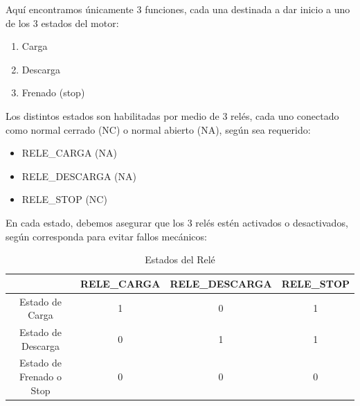                 Aquí encontramos únicamente 3 funciones, cada una destinada a dar inicio a uno de los 3 estados del motor:\par

                \begin{enumerate}
                \setlength{\itemindent}{1.5em}
                    \item Carga
                    \item Descarga
                    \item Frenado (stop)
                \end{enumerate}
                
                Los distintos estados son habilitadas por medio de 3 relés, cada uno conectado como normal cerrado (NC) o normal abierto (NA), según sea requerido:\par

                \begin{itemize} [label = ·]
                \setlength{\itemindent}{1.5em}
                
                    \item RELE\_CARGA (NA)
                    \item RELE\_DESCARGA (NA)
                    \item RELE\_STOP (NC)
                \end{itemize}
                
                En cada estado, debemos asegurar que los 3 relés estén activados o desactivados, según corresponda para evitar fallos mecánicos:\par

                \begin{table}[H]
                    \centering
                    \begin{tabular}{|c|c|c|c|}
                    \hline
                         & RELE\_CARGA & RELE\_DESCARGA & RELE\_STOP\\
                    \hline
                         Estado de Carga & 1 & 0 & 1\\
                    \hline
                         Estado de Descarga & 0 & 1 & 1\\
                    \hline
                         Estado de Frenado o Stop & 0 & 0 & 0\\
                    \hline
                    \end{tabular}
                    \caption{Estados del Relé}
                    \label{tab:s7}
                \end{table}

